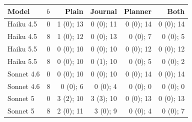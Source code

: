 \begin{tabular}{llrrrr}
\toprule
Model & $b$ & Plain & Journal & Planner & Both \\
\midrule
Haiku 4.5 & 0 & 1 (0); 13 & 0 (0); 11 & 0 (0); 14 & 0 (0); 14 \\
Haiku 4.5 & 8 & 1 (0); 12 & 0 (0); 13 & 0 (0); 7 & 0 (0); 5 \\
Haiku 5.5 & 0 & 0 (0); 10 & 0 (0); 10 & 0 (0); 12 & 0 (0); 12 \\
Haiku 5.5 & 8 & 0 (0); 10 & 0 (1); 10 & 0 (0); 5 & 0 (0); 2 \\
Sonnet 4.6 & 0 & 0 (0); 10 & 0 (0); 10 & 0 (0); 14 & 0 (0); 14 \\
Sonnet 4.6 & 8 & 0 (0); 6 & 0 (0); 4 & 0 (0); 0 & 0 (0); 0 \\
Sonnet 5 & 0 & 3 (2); 10 & 3 (3); 10 & 0 (0); 13 & 0 (0); 13 \\
Sonnet 5 & 8 & 2 (0); 11 & 3 (0); 9 & 0 (0); 4 & 0 (0); 7 \\
\bottomrule
\end{tabular}

